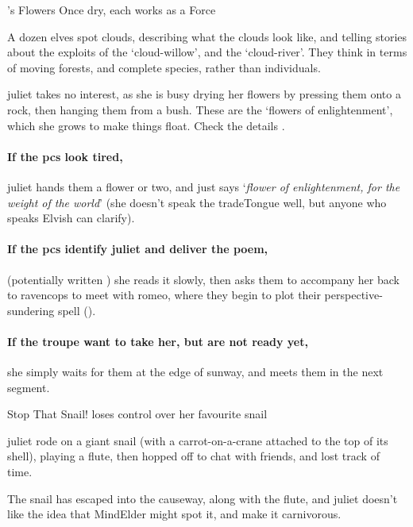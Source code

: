 {'s Flowers}%
{Once dry, each works as a Force }%

A dozen elves spot clouds, describing what the clouds look like, and telling stories about the exploits of the `cloud-willow', and the `cloud-river'.
They think in terms of moving forests, and complete species, rather than individuals.

\Gls{juliet} takes no interest, as she is busy drying her flowers by pressing them onto a rock, then hanging them from a bush.
These are the `flowers of enlightenment', which she grows to make things float.
Check the details .

\juliet

\paragraph{If the \glspl{pc} look tired,}
\gls{juliet} hands them a flower or two, and just says `\textit{flower of enlightenment, for the weight of the world}' (she doesn't speak the \gls{tradeTongue} well, but anyone who speaks Elvish can clarify).

\paragraph{If the \glspl{pc} identify \gls{juliet} and deliver the poem,}
(potentially written ) she reads it slowly, then asks them to accompany her back to \gls{ravencops} to meet with \gls{romeo}, where they begin to plot their perspective-sundering spell ().

\paragraph{If the troupe want to take her, but are not ready yet,}
she simply waits for them at the edge of \gls{sunway}, and meets them in the next \gls{segment}.

{Stop That Snail!}%
{ loses control over her favourite snail}%

\Gls{juliet} rode on a giant snail (with a carrot-on-a-crane attached to the top of its shell), playing a flute, then hopped off to chat with friends, and lost track of time.

The snail has escaped into the causeway, along with the flute, and \gls{juliet} doesn't like the idea that \gls{MindElder} might spot it, and make it carnivorous.

